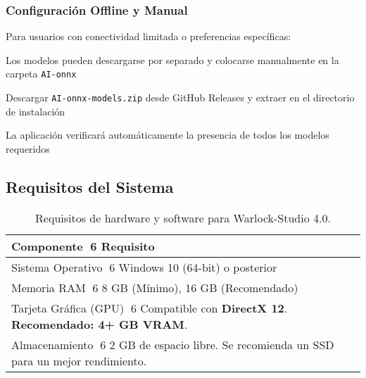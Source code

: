 \documentclass[11pt, a4paper]{article}
\begin{document}
\subsubsection{Configuración Offline y Manual}
Para usuarios con conectividad limitada o preferencias específicas:
\begin{description}[leftmargin=*, style=nextline]
    \item[Instalación Offline:] Los modelos pueden descargarse por separado y colocarse manualmente en la carpeta \texttt{AI-onnx}
    \item[Ubicación Manual:] Descargar \texttt{AI-onnx-models.zip} desde GitHub Releases y extraer en el directorio de instalación
    \item[Verificación de Archivos:] La aplicación verificará automáticamente la presencia de todos los modelos requeridos
\end{description}

\subsection{Requisitos del Sistema}
\begin{table}[H]
    \centering %
    \begin{tabular}{ll}
        \toprule %
        \textbf{Componente} 6 \textbf{Requisito} \\
        \midrule %
        Sistema Operativo 6 Windows 10 (64-bit) o posterior \\
        Memoria RAM 6 8 GB (Mínimo), 16 GB (Recomendado) \\
        Tarjeta Gráfica (GPU) 6 Compatible con \textbf{DirectX 12}. \textbf{Recomendado: 4+ GB VRAM}. \\
        Almacenamiento 6 2 GB de espacio libre. Se recomienda un SSD para un mejor rendimiento. \\
        \bottomrule %
    \end{tabular}
    \caption{Requisitos de hardware y software para Warlock-Studio 4.0.}
\end{table}
\end{document}
